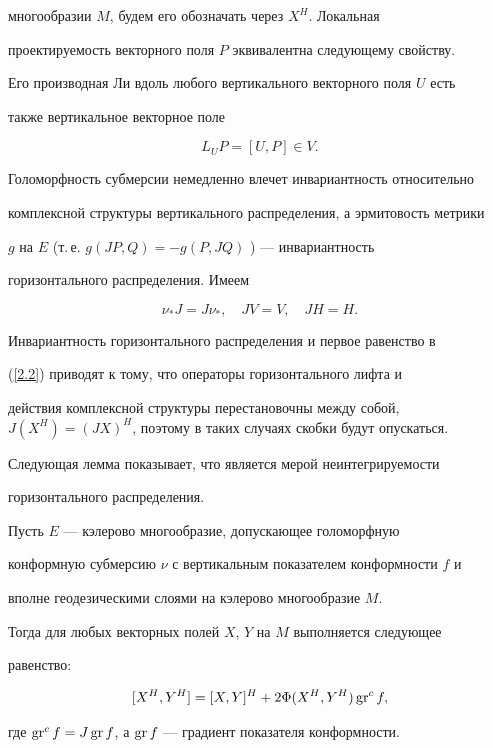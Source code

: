 многообразии $M$, будем его обозначать через $X^H$. Локальная


проектируемость векторного поля $P$ эквивалентна следующему свойству.


Его производная Ли вдоль любого вертикального векторного поля $U$ есть


также вертикальное векторное поле


\begin{equation}


L_UP=[U,P]\in V.


\label{2.1}


\end{equation}


Голоморфность субмерсии немедленно влечет инвариантность относительно


комплексной структуры вертикального распределения, а эрмитовость метрики


$g$ на $E$ (т.\,е. $g(JP,Q)=-g(P,JQ)$ ) --- инвариантность


горизонтального распределения. Имеем


\begin{equation}


\nu_*J=J\nu_*, \quad JV=V,\quad JH=H.


\label{2.2}


\end{equation}


Инвариантность горизонтального распределения и первое равенство в


(\ref{2.2}) приводят к тому, что операторы горизонтального лифта и


действия комплексной структуры перестановочны между собой, $J(X^H)=(JX)^


H$, поэтому в таких случаях скобки будут опускаться.





Следующая лемма показывает, что является мерой неинтегрируемости


горизонтального распределения.





\begin{lems}\label{lm2.1}


Пусть $E$ --- кэлерово многообразие, допускающее голоморфную


конформную субмерсию $\nu$ с вертикальным показателем конформности $f$ и


вполне геодезическими слоями на кэлерово многообразие $M$.


Тогда для любых векторных полей $X$, $Y$ на $M$ выполняется следующее


равенство$:$


$$


[X^H,Y^H]=[X,Y]^H+2\Phi (X^H,Y^H)\gr^c f,


$$


где $\operatorname{gr}^c f=J\operatorname{gr} f$, а $\operatorname{gr} f$ --- градиент показателя конформности.


\end{lems}





